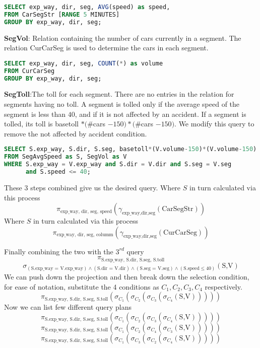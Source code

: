 \begin{lstlisting}[language=SQL, caption= SEGAVGSPEED linear road query]
SELECT exp_way, dir, seg, AVG(speed) as speed,
FROM CarSegStr [RANGE 5 MINUTES]
GROUP BY exp_way, dir, seg;
\end{lstlisting}


\par \textbf{SegVol}: Relation containing the number of cars currently in a segment. The relation CurCarSeg is used to determine the cars in each segment.

\begin{lstlisting}[language=SQL, caption= SEGVOL linear road query]
SELECT exp_way, dir, seg, COUNT(*) as volume
FROM CurCarSeg
GROUP BY exp_way, dir, seg;
\end{lstlisting}


\par \textbf{SegToll}:The toll for each segment. There are no entries in the relation for segments having no toll. A segment is tolled only if the average speed of the segment is less than $40$, and if it is not affected by an accident. If a segment is tolled, its toll is basetoll $* (\#$cars $- 150) * (\#$cars $- 150)$. We modify this query to remove the not affected by accident  condition.


\begin{lstlisting}[language=SQL, caption= SEGTOLL linear road query]
SELECT S.exp_way, S.dir, S.seg, basetoll*(V.volume-150)*(V.volume-150)
FROM SegAvgSpeed as S, SegVol as V
WHERE S.exp_way = V.exp_way and S.dir = V.dir and S.seg = V.seg
      and S.speed <= 40;
\end{lstlisting}

These 3 steps combined give us the desired query.
Where $S$ in turn calculated via this process
$$\pi_{\text{exp\_way, dir, seg, speed}}(\gamma_{\text{exp\_way,dir,seg}} (\text{CarSegStr}))$$
Where $S$ in turn calculated via this process
$$\pi_{\text{exp\_way, dir, seg, columm}}(\gamma_{\text{exp\_way,dir,seg}} (\text{CurCarSeg}))$$

Finally combining the two with the $3^{rd}$ query 
$$\pi_{\text{S.exp\_way, S.dir, S.seg, S.toll}}$$
$$\sigma_{(\text{S.exp\_way = V.exp\_way}) \land (\text{S.dir = V.dir}) \land (\text{S.seg = V.seg})\land (\text{S.speed} \leq 40)}(\text{S,V})$$
We can push down the projection and then break down the selection condition, for ease of notation, substitute the 4 conditions as $C_1,C_2,C_3,C_4$ respectively.
$$\pi_{\text{S.exp\_way, S.dir, S.seg, S.toll}}(\sigma_{C_1}(\sigma_{C_2}(\sigma_{C_3}(\sigma_{C_4}(\text{S,V})))))$$
Now we can list few different query plans
$$\pi_{\text{S.exp\_way, S.dir, S.seg, S.toll}}(\sigma_{C_1}(\sigma_{C_2}(\sigma_{C_3}(\sigma_{C_4}(\text{S,V})))))$$
$$\pi_{\text{S.exp\_way, S.dir, S.seg, S.toll}}(\sigma_{C_1}(\sigma_{C_2}(\sigma_{C_4}(\sigma_{C_3}(\text{S,V})))))$$
$$\pi_{\text{S.exp\_way, S.dir, S.seg, S.toll}}(\sigma_{C_1}(\sigma_{C_3}(\sigma_{C_2}(\sigma_{C_4}(\text{S,V})))))$$

